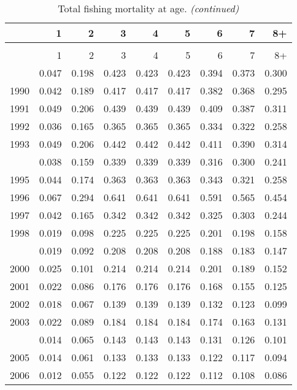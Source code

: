 \documentclass[
]{article}
\begin{document}
\begin{longtable}[t]{lrrrrrrrr}
\caption{\label{tab:FAA-tot-table}Total fishing mortality at age.}\\
\toprule
  & 1 & 2 & 3 & 4 & 5 & 6 & 7 & 8+\\
\midrule
\endfirsthead
\caption[]{Total fishing mortality at age. \textit{(continued)}}\\
\toprule
  & 1 & 2 & 3 & 4 & 5 & 6 & 7 & 8+\\
\midrule
\endhead

\endfoot
\bottomrule
\endlastfoot
1989 & 0.047 & 0.198 & 0.423 & 0.423 & 0.423 & 0.394 & 0.373 & 0.300\\
1990 & 0.042 & 0.189 & 0.417 & 0.417 & 0.417 & 0.382 & 0.368 & 0.295\\
1991 & 0.049 & 0.206 & 0.439 & 0.439 & 0.439 & 0.409 & 0.387 & 0.311\\
1992 & 0.036 & 0.165 & 0.365 & 0.365 & 0.365 & 0.334 & 0.322 & 0.258\\
1993 & 0.049 & 0.206 & 0.442 & 0.442 & 0.442 & 0.411 & 0.390 & 0.314\\
\addlinespace
1994 & 0.038 & 0.159 & 0.339 & 0.339 & 0.339 & 0.316 & 0.300 & 0.241\\
1995 & 0.044 & 0.174 & 0.363 & 0.363 & 0.363 & 0.343 & 0.321 & 0.258\\
1996 & 0.067 & 0.294 & 0.641 & 0.641 & 0.641 & 0.591 & 0.565 & 0.454\\
1997 & 0.042 & 0.165 & 0.342 & 0.342 & 0.342 & 0.325 & 0.303 & 0.244\\
1998 & 0.019 & 0.098 & 0.225 & 0.225 & 0.225 & 0.201 & 0.198 & 0.158\\
\addlinespace
1999 & 0.019 & 0.092 & 0.208 & 0.208 & 0.208 & 0.188 & 0.183 & 0.147\\
2000 & 0.025 & 0.101 & 0.214 & 0.214 & 0.214 & 0.201 & 0.189 & 0.152\\
2001 & 0.022 & 0.086 & 0.176 & 0.176 & 0.176 & 0.168 & 0.155 & 0.125\\
2002 & 0.018 & 0.067 & 0.139 & 0.139 & 0.139 & 0.132 & 0.123 & 0.099\\
2003 & 0.022 & 0.089 & 0.184 & 0.184 & 0.184 & 0.174 & 0.163 & 0.131\\
\addlinespace
2004 & 0.014 & 0.065 & 0.143 & 0.143 & 0.143 & 0.131 & 0.126 & 0.101\\
2005 & 0.014 & 0.061 & 0.133 & 0.133 & 0.133 & 0.122 & 0.117 & 0.094\\
2006 & 0.012 & 0.055 & 0.122 & 0.122 & 0.122 & 0.112 & 0.108 & 0.086\\

\end{longtable}
\end{document}
